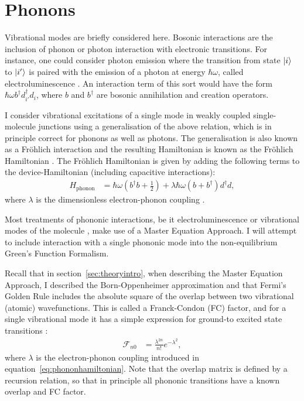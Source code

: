 \section{Phonons}
\label{sec:phononic}

Vibrational modes are briefly considered here. Bosonic interactions are the inclusion of phonon or photon interaction with electronic transitions. For instance, one could consider photon emission where the transition from state $\ket{i}$ to $\ket{i'}$ is paired with the emission of a photon at energy $\hbar \omega$, called electroluminescence \cite{electroluminescence}. An interaction term of this sort would have the form $\hbar\omega b^\dagger d_{i'}^\dagger d_i$, where $b$ and $b^\dagger$ are bosonic annihilation and creation operators.

I consider vibrational excitations of a single mode in weakly coupled single-molecule junctions using a generalisation of the above relation, which is in principle correct for phonons as well as photons. The generalisation is also known as a Fr\"ohlich interaction and the resulting Hamiltonian is known as the Fr\"ohlich Hamiltonian \cite{frohlich}. The Fr\"ohlich Hamiltonian is given by adding the following terms to the device-Hamiltonian (including capacitive interactions):
\begin{align}
H_\text{phonon} &= \hbar \omega \left(b^\dagger b + \frac{1}{2}\right) + \lambda \hbar \omega (b + b^\dagger) d^\dagger d, \label{eq:phononhamiltonian}
\end{align}
where $\lambda$ is the dimensionless electron-phonon coupling \cite{kaspermothpoulsen}.

Most treatments of phononic interactions, be it electroluminescence \cite{electroluminescence} or vibrational modes of the molecule \cite{vibrationcomputation}, make use of a Master Equation Approach. I will attempt to include interaction with a single phononic mode into the non-equilibrium Green's Function Formalism.

Recall that in section~\ref{sec:theoryintro}, when describing the Master Equation Approach, I describ\-ed the Born-Oppenheimer approximation and that Fermi's Golden Rule includes the absolute square of the overlap between two vibrational (atomic) wavefunctions. This is called a Franck-Condon (FC) factor, and for a single vibrational mode it has a simple expression for ground-to excited state transitions \cite{kaspermothpoulsen}:
\begin{align}
\mathscr{F}_{n0} &= \frac{\lambda^{2n}}{n!} e^{-\lambda^2},
\label{eq:fcfactor}
\end{align}
where $\lambda$ is the electron-phonon coupling introduced in equation~\ref{eq:phononhamiltonian}.  Note that the overlap matrix is defined by a recursion relation, so that in principle all phononic transitions have a known overlap and FC factor.

